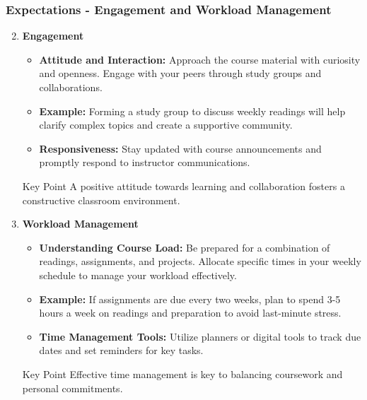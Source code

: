 \documentclass[aspectratio=169]{beamer}
\begin{document}
\begin{frame}[fragile]
    \frametitle{Expectations - Engagement and Workload Management}
    \begin{enumerate}
        \setcounter{enumi}{1} %
        \item \textbf{Engagement}
        \begin{itemize}
            \item \textbf{Attitude and Interaction:} Approach the course material with curiosity and openness. Engage with your peers through study groups and collaborations.
            \item \textbf{Example:} Forming a study group to discuss weekly readings will help clarify complex topics and create a supportive community.
            \item \textbf{Responsiveness:} Stay updated with course announcements and promptly respond to instructor communications.
        \end{itemize}
        \begin{block}{Key Point}
            A positive attitude towards learning and collaboration fosters a constructive classroom environment.
        \end{block}
        
        \item \textbf{Workload Management}
        \begin{itemize}
            \item \textbf{Understanding Course Load:} Be prepared for a combination of readings, assignments, and projects. Allocate specific times in your weekly schedule to manage your workload effectively.
            \item \textbf{Example:} If assignments are due every two weeks, plan to spend 3-5 hours a week on readings and preparation to avoid last-minute stress.
            \item \textbf{Time Management Tools:} Utilize planners or digital tools to track due dates and set reminders for key tasks.
        \end{itemize}
        \begin{block}{Key Point}
            Effective time management is key to balancing coursework and personal commitments.
        \end{block}
    \end{enumerate}
\end{frame}
\end{document}
